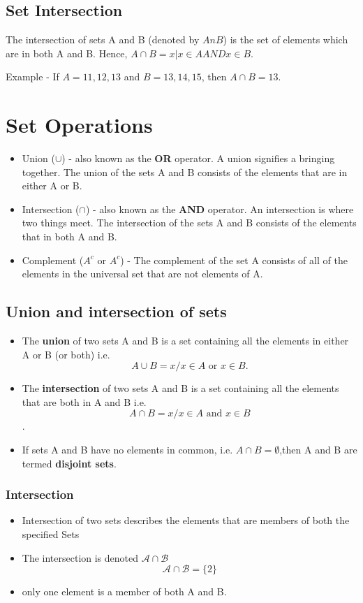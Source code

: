 \documentclass[12pt]{article}
\begin{document}
\subsection{Set Intersection}
The intersection of sets A and B (denoted by $AnB$) is the set of elements which are in both A and B. Hence, $A \cap B={x|x \in A AND x \in B}$.

Example - If $A={11,12,13}$ and $B={13,14,15}$, then $A \cap B={13}$.


\newpage
\section*{Set Operations}
\begin{itemize}
\item Union ($\cup$) - also known as the \textbf{OR} operator. A union signifies a bringing together. The union of the sets A and B consists of the elements that are in either A or B.
\item Intersection ($\cap$) - also known as the \textbf{AND} operator. An intersection is where two things meet. The intersection of the sets A and B consists of the elements that in both A and B.
\item Complement ($A^{c}$ or $A^{c}$) - The complement of the set A consists of all of the elements in the universal set that are not elements of A.
\end{itemize}

\newpage
\subsection*{Union and intersection of sets}
\begin{itemize}
\item The \textbf{union} of two sets A and B is a set containing all the elements in
either A or B (or both)
i.e.
\[A \cup B = {x / x \in A \mbox{ or } x \in B}.\]
\item The \textbf{intersection} of two sets A and B is a set containing all the elements
that are both in A and B
i.e.
\[A \cap B = {x / x \in A \mbox{ and }x \in B}\].
\item If sets A and B have no elements in common, i.e. $A \cap B = \emptyset$,then A and B
are termed \textbf{disjoint sets}.
\end{itemize}
\newpage
\subsubsection*{Intersection}
\begin{itemize}
\item Intersection of two sets describes the elements that are members of both the specified Sets
\item The intersection is denoted $\mathcal{A\cap B}$
\[ \mathcal{A\cap B} = \{2\}\]
\item only one element is a member of both A and B.
\end{itemize}
\end{document}
